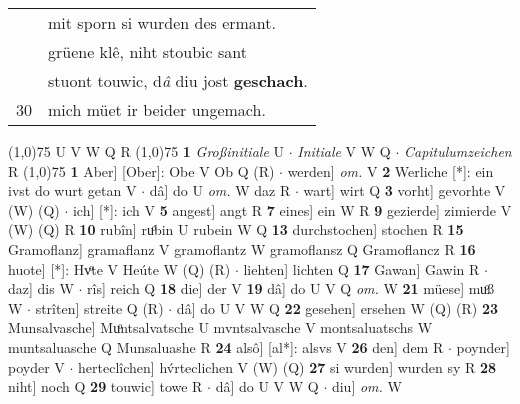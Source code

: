 \documentclass[8pt,a4paper,notitlepage]{article}
\begin{document}
\begin{table}[ht]
\begin{minipage}[t]{0.5\linewidth}
\begin{tabular}{rl}
 & mit sporn si wurden des ermant.\\ 
 & grüene klê, niht stoubic sant\\ 
 & stuont touwic, d\textit{â} diu jost \textbf{geschach}.\\ 
30 & mich müet ir beider ungemach.\\ 
\end{tabular}
\scriptsize
\line(1,0){75} \newline
U V W Q R \newline
\line(1,0){75} \newline
\textbf{1} \textit{Großinitiale} U   $\cdot$ \textit{Initiale} V W Q   $\cdot$ \textit{Capitulumzeichen} R  \newline
\line(1,0){75} \newline
\textbf{1} Aber] [Ober]: Obe V Ob Q (R)  $\cdot$ werden] \textit{om.} V \textbf{2} Werliche [*]: ein ivst do wurt getan V  $\cdot$ dâ] do U \textit{om.} W daz R  $\cdot$ wart] wirt Q \textbf{3} vorht] gevorhte V (W) (Q)  $\cdot$ ich] [*]: ich V \textbf{5} angest] angt R \textbf{7} eines] ein W R \textbf{9} gezierde] zimierde V (W) (Q) R \textbf{10} rubîn] ruͦbin U rubein W Q \textbf{13} durchstochen] stochen R \textbf{15} Gramoflanz] gramaflanz V gramoflantz W gramoflansz Q Gramoflancz R \textbf{16} huote] [*]: Hvͦte V Heúte W (Q) (R)  $\cdot$ liehten] lichten Q \textbf{17} Gawan] Gawin R  $\cdot$ daz] dis W  $\cdot$ rîs] reich Q \textbf{18} die] der V \textbf{19} dâ] do U V Q \textit{om.} W \textbf{21} müese] muͦß W  $\cdot$ strîten] streite Q (R)  $\cdot$ dâ] do U V W Q \textbf{22} gesehen] ersehen W (Q) (R) \textbf{23} Munsalvasche] Muͦntsalvatsche U mvntsalvasche V montsaluatschs W muntsaluasche Q Munsaluashe R \textbf{24} alsô] [al*]: alsvs V \textbf{26} den] dem R  $\cdot$ poynder] poyder V  $\cdot$ herteclîchen] hv́rteclichen V (W) (Q) \textbf{27} si wurden] wurden sy R \textbf{28} niht] noch Q \textbf{29} touwic] towe R  $\cdot$ dâ] do U V W Q  $\cdot$ diu] \textit{om.} W \newline
\end{minipage}
\end{table}
\end{document}
